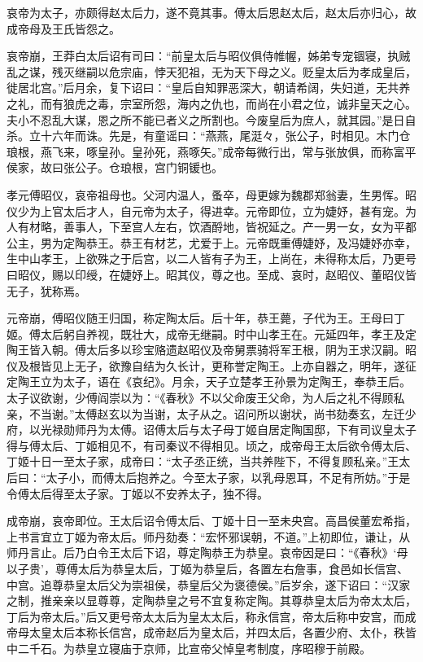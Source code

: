 \documentclass[12pt,UTF8]{ctexbook}
\begin{document}
哀帝为太子，亦颇得赵太后力，遂不竟其事。傅太后恩赵太后，赵太后亦归心，故成帝母及王氏皆怨之。



哀帝崩，王莽白太后诏有司曰：“前皇太后与昭仪俱侍帷幄，姊弟专宠锢寝，执贼乱之谋，残灭继嗣以危宗庙，悖天犯祖，无为天下母之义。贬皇太后为孝成皇后，徙居北宫。”后月余，复下诏曰：“皇后自知罪恶深大，朝请希阔，失妇道，无共养之礼，而有狼虎之毒，宗室所怨，海内之仇也，而尚在小君之位，诚非皇天之心。夫小不忍乱大谋，恩之所不能已者义之所割也。今废皇后为庶人，就其园。”是日自杀。立十六年而诛。先是，有童谣曰：“燕燕，尾涏々，张公子，时相见。木门仓琅根，燕飞来，啄皇孙。皇孙死，燕啄矢。”成帝每微行出，常与张放俱，而称富平侯家，故曰张公子。仓琅根，宫门铜锾也。



孝元傅昭仪，哀帝祖母也。父河内温人，蚤卒，母更嫁为魏郡郑翁妻，生男恽。昭仪少为上官太后才人，自元帝为太子，得进幸。元帝即位，立为婕妤，甚有宠。为人有材略，善事人，下至宫人左右，饮酒酹地，皆祝延之。产一男一女，女为平都公主，男为定陶恭王。恭王有材艺，尤爱于上。元帝既重傅婕妤，及冯婕妤亦幸，生中山孝王，上欲殊之于后宫，以二人皆有子为王，上尚在，未得称太后，乃更号曰昭仪，赐以印绶，在婕妤上。昭其仪，尊之也。至成、哀时，赵昭仪、董昭仪皆无子，犹称焉。



元帝崩，傅昭仪随王归国，称定陶太后。后十年，恭王薨，子代为王。王母曰丁姬。傅太后躬自养视，既壮大，成帝无继嗣。时中山孝王在。元延四年，孝王及定陶王皆入朝。傅太后多以珍宝赂遗赵昭仪及帝舅票骑将军王根，阴为王求汉嗣。昭仪及根皆见上无子，欲豫自结为久长计，更称誉定陶王。上亦自器之，明年，遂征定陶王立为太子，语在《哀纪》。月余，天子立楚孝王孙景为定陶王，奉恭王后。太子议欲谢，少傅阎崇以为：“《春秋》不以父命废王父命，为人后之礼不得顾私亲，不当谢。”太傅赵玄以为当谢，太子从之。诏问所以谢状，尚书劾奏玄，左迁少府，以光禄勋师丹为太傅。诏傅太后与太子母丁姬自居定陶国邸，下有司议皇太子得与傅太后、丁姬相见不，有司秦议不得相见。顷之，成帝母王太后欲令傅太后、丁姬十日一至太子家，成帝曰：“太子丞正统，当共养陛下，不得复顾私亲。”王太后曰：“太子小，而傅太后抱养之。今至太子家，以乳母恩耳，不足有所妨。”于是令傅太后得至太子家。丁姬以不安养太子，独不得。



成帝崩，哀帝即位。王太后诏令傅太后、丁姬十日一至未央宫。高昌侯董宏希指，上书言宜立丁姬为帝太后。师丹劾奏：“宏怀邪误朝，不道。”上初即位，谦让，从师丹言止。后乃白令王太后下诏，尊定陶恭王为恭皇。哀帝因是曰：“《春秋》‘母以子贵’，尊傅太后为恭皇太后，丁姬为恭皇后，各置左右詹事，食邑如长信宫、中宫。追尊恭皇太后父为崇祖侯，恭皇后父为褒德侯。”后岁余，遂下诏曰：“汉家之制，推亲亲以显尊尊，定陶恭皇之号不宜复称定陶。其尊恭皇太后为帝太太后，丁后为帝太后。”后又更号帝太太后为皇太太后，称永信宫，帝太后称中安宫，而成帝母太皇太后本称长信宫，成帝赵后为皇太后，并四太后，各置少府、太仆，秩皆中二千石。为恭皇立寝庙于京师，比宣帝父悼皇考制度，序昭穆于前殿。
\end{document}
